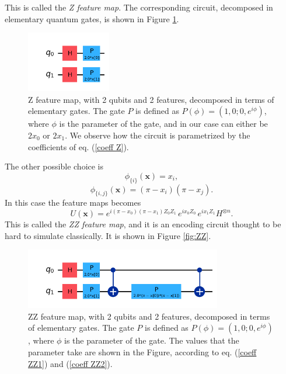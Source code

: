 \documentclass[12pt]{article}
\begin{document}
\begin{itemize}
    This is called the \textit{Z feature map}. The corresponding circuit, decomposed in elementary quantum gates, is shown in Figure \ref{fig:Z}. 
    \begin{figure}[h!]
        \centering
        \includegraphics[height=100px]{images/Z.png}
        \caption{Z feature map, with 2 qubits and 2 features, decomposed in terms of elementary gates. The gate $P$ is defined as $P(\phi) = (1,0; 0, e^{i\phi})$, where $\phi$ is the parameter of the gate, and in our case can either be $2x_0$ or $2x_1$. We observe how the circuit is parametrized by the coefficients of eq. (\ref{coeff Z}).}
        \label{fig:Z}
    \end{figure}
    The other possible choice is  
    \begin{equation}
        \phi_{\{i\}}(\mathbf{x})=x_i,
        \label{coeff ZZ1}
    \end{equation}
    \begin{equation}
        \phi_{\{i,j\}}(\mathbf{x})=(\pi-x_i)(\pi-x_j).
        \label{coeff ZZ2}
    \end{equation}
    In this case the feature maps becomes 
    \begin{equation}
        {U}(\mathbf{x})=e^{i(\pi-x_0)(\pi-x_1)Z_0Z_1}\,e^{ix_0Z_0}\,e^{ix_1Z_1}H^{\otimes n}.
    \end{equation}
    This is called the \textit{ZZ feature map}, and it is an encoding circuit thought to be hard to simulate classically. It is shown in Figure \ref{fig:ZZ}. 
    \begin{figure}[h!]
        \centering
        \includegraphics[height=100px]{images/ZZ.png}
        \caption{ZZ feature map, with 2 qubits and 2 features, decomposed in terms of elementary gates. The gate $P$ is defined as $P(\phi) = (1,0; 0, e^{i\phi})$, where $\phi$ is the parameter of the gate. The values that the parameter take are shown in the Figure, according to eq. (\ref{coeff ZZ1}) and (\ref{coeff ZZ2}).}

\end{figure}
\end{itemize}
\end{document}
